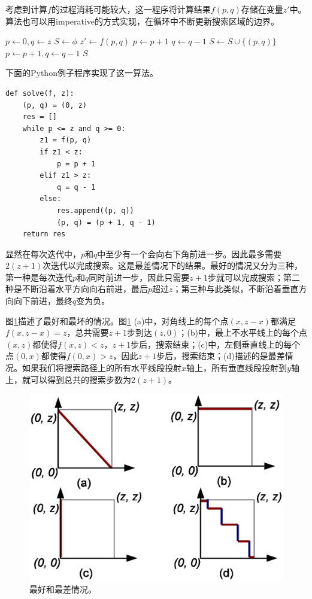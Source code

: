 \documentclass[UTF8]{article}
\begin{document}
考虑到计算$f$的过程消耗可能较大，这一程序将计算结果$f(p, q)$存储在变量$z'$中。算法也可以用imperative的方式实现，在循环中不断更新搜索区域的边界。

\begin{algorithmic}[1]
  \State $p \gets 0, q \gets z$
  \State $S \gets \phi$
    \State $z' \gets f(p, q)$
      \State $p \gets p + 1$
      \State $q \gets q - 1$
    \Else
      \State $S \gets S \cup \{(p, q)\}$
      \State $p \gets p + 1, q \gets q - 1$
    \EndIf
  \EndWhile
  \State \Return $S$
\EndFunction
\end{algorithmic}

下面的Python例子程序实现了这一算法。

\lstset{language=Python}
\begin{lstlisting}
def solve(f, z):
    (p, q) = (0, z)
    res = []
    while p <= z and q >= 0:
        z1 = f(p, q)
        if z1 < z:
            p = p + 1
        elif z1 > z:
            q = q - 1
        else:
            res.append((p, q))
            (p, q) = (p + 1, q - 1)
    return res

\end{lstlisting}

显然在每次迭代中，$p$和$q$中至少有一个会向右下角前进一步。因此最多需要$2(z+1)$次迭代以完成搜索。这是最差情况下的结果。最好的情况又分为三种，第一种是每次迭代$p$和$q$同时前进一步，因此只需要$z+1$步就可以完成搜索；第二种是不断沿着水平方向向右前进，最后$p$超过$z$；第三种与此类似，不断沿着垂直方向向下前进，最终$q$变为负。

图\ref{fig:saddleback-1-cases}描述了最好和最坏的情况。图\ref{fig:saddleback-1-cases} (a)中，对角线上的每个点$(x, z-x)$都满足$f(x, z-x) = z$，总共需要$z+1$步到达$(z, 0)$；(b)中，最上不水平线上的每个点$(x, z)$都使得$f(x, z) < z$，$z+1$步后，搜索结束；(c)中，左侧垂直线上的每个点$(0, x)$都使得$f(0, x) > z$，因此$z+1$步后，搜索结束；(d)描述的是最差情况。如果我们将搜索路径上的所有水平线段投射$x$轴上，所有垂直线段投射到$y$轴上，就可以得到总共的搜索步数为$2(z+1)$。

\begin{figure}[htbp]
 \centering
 \includegraphics[scale=0.5]{img/saddleback-1-cases.eps}
 \caption{最好和最差情况。}
 \label{fig:saddleback-1-cases}
\end{figure}
\end{document}
